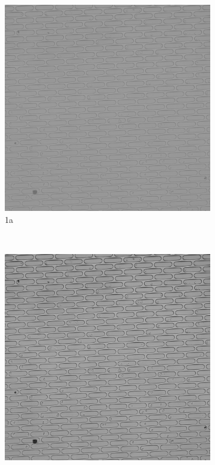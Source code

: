 \documentclass[pdftex,12pt,a4paper]{report}
\begin{document}
\begin{figure}[H]
\centering

\begin{subfigure}{0.4\textwidth}
  \centering
  \includegraphics[width=\textwidth]{images/pos_41_in_t0_br_up100}
  \caption{1a}
  \label{fig:pos41_brup100_bf}
\end{subfigure}%
~
\begin{subfigure}{0.4\textwidth}
  \centering
  \includegraphics[width=\textwidth]{images/pos_41_in_t0_br_times3}
  \caption{}
  \label{fig:pos41_times3_bf}
\end{subfigure}%


\end{figure}
\end{document}
